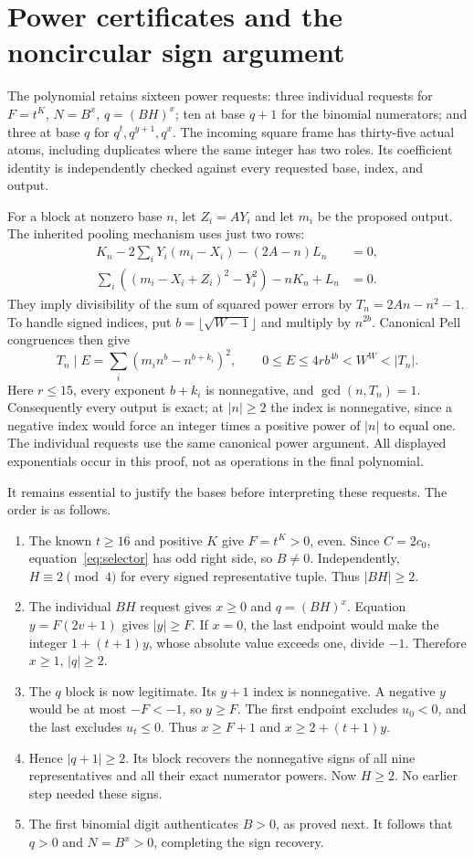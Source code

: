 \section{Power certificates and the noncircular sign argument}

The polynomial retains sixteen power requests: three individual requests
for $F=t^K$, $N=B^x$, $q=(BH)^x$; ten at base $q+1$ for the binomial
numerators; and three at base $q$ for $q^t,q^{y+1},q^x$.
The incoming square frame has thirty-five actual atoms, including duplicates where
the same integer has two roles. Its coefficient identity is independently
checked against every requested base, index, and output.

For a block at nonzero base $n$, let $Z_i=AY_i$ and let $m_i$ be the
proposed output. The inherited pooling mechanism uses just two rows:
\begin{align*}
 K_n-2\sum_iY_i(m_i-X_i)-(2A-n)L_n&=0,\\
 \sum_i((m_i-X_i+Z_i)^2-Y_i^2)-nK_n+L_n&=0.
\end{align*}
They imply divisibility of the sum of squared power errors by
$T_n=2An-n^2-1$. To handle signed indices, put
$b=\lfloor\sqrt{W-1}\rfloor$ and multiply by $n^{2b}$. Canonical
Pell congruences then give
\[
 T_n\mid E=\sum_i(m_i n^b-n^{b+k_i})^2,
 \qquad 0\le E\le4r b^{4b}<W^W<|T_n|.
\]
Here $r\le15$, every exponent $b+k_i$ is nonnegative, and
$\gcd(n,T_n)=1$. Consequently every output is exact; at $|n|\ge2$
the index is nonnegative, since a negative index would force an integer
times a positive power of $|n|$ to equal one. The individual requests
use the same canonical power argument. All displayed exponentials occur
in this proof, not as operations in the final polynomial.

It remains essential to justify the bases before interpreting these
requests. The order is as follows.
\begin{enumerate}
\item The known $t\ge16$ and positive $K$ give $F=t^K>0$, even.
      Since $C=2c_0$, equation~\eqref{eq:selector} has odd right side,
      so $B\ne0$. Independently, $H\equiv2\pmod4$ for every signed
      representative tuple. Thus $|BH|\ge2$.
\item The individual $BH$ request gives $x\ge0$ and $q=(BH)^x$.
      Equation $y=F(2v+1)$ gives $|y|\ge F$. If $x=0$, the last
      endpoint would make the integer $1+(t+1)y$, whose absolute value
      exceeds one, divide $-1$. Therefore $x\ge1$, $|q|\ge2$.
\item The $q$ block is now legitimate. Its $y+1$ index is nonnegative.
      A negative $y$ would be at most $-F<-1$, so $y\ge F$.
      The first endpoint excludes $u_0<0$, and the last excludes
      $u_t\le0$. Thus $x\ge F+1$ and $x\ge2+(t+1)y$.
\item Hence $|q+1|\ge2$. Its block recovers the nonnegative signs
      of all nine representatives and all their exact numerator powers.
      Now $H\ge2$. No earlier step needed these signs.
\item The first binomial digit authenticates $B>0$, as proved next.
      It follows that $q>0$ and $N=B^x>0$, completing the sign recovery.
\end{enumerate}

